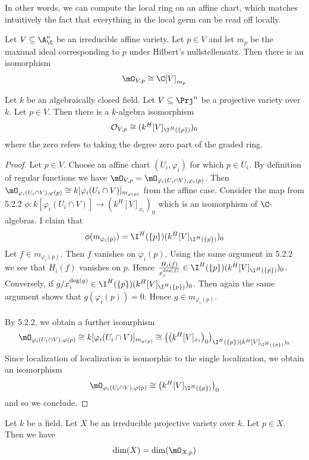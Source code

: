 \documentclass[a4paper]{article}
\begin{document}
In other words, we can compute the local ring on an affine chart, which matches intuitively the fact that everything in the local germ can be read off locally. 

\begin{prp}{}{} Let $V\subseteq\A_\C^n$ be an irreducible affine variety. Let $p\in V$ and let $m_p$ be the maximal ideal corresponding to $p$ under Hilbert's nullstellensatz. Then there is an isomorphism $$\mO_{V,p}\cong\C[V]_{m_p}$$
\end{prp}

\begin{prp}{}{} Let $k$ be an algebraically closed field. Let $V\subseteq\Prj^n$ be a projective variety over $k$. Let $p\in V$. Then there is a $k$-algebra isomorphism $$\mathcal{O}_{V,p}\cong(k^H[V]_{\I^H(\{p\})})_0$$ where the zero refers to taking the degree zero part of the graded ring. 
\begin{proof}
Let $p\in V$. Choose an affine chart $(U_i,\varphi_i)$ for which $p\in U_i$. By definition of regular functions we have $\mO_{V,p}=\mO_{\varphi_i(U_i\cap V),\varphi_i(p)}$.  Then $\mO_{\varphi_i(U_i\cap V),\varphi(p)}\cong k[\varphi_i(U_i\cap V)]_{m_{\varphi(p)}}$ from the affine case. Consider the map from 5.2.2 $\phi:k[\varphi_i(U_i\cap V)]\to (k^H[V]_{x_i})_0$ which is an isomorphism of $\C$-algebras. I claim that $$\phi(m_{\varphi_i(p)})=\I^H(\{p\})(k^H[V]_{\I^H(\{p\})})_0$$ Let $f\in m_{\varphi_i(p)}$. Then $f$ vanishes on $\varphi_i(p)$. Using the same argument in 5.2.2 we see that $H_i(f)$ vanishes on $p$. Hence $\frac{H_i(f)}{x_i^{\deg(f)}}\in\I^H(\{p\})(k^H[V]_{\I^H(\{p\})})_0$. Conversely, if $g/x_i^{\deg(g)}\in\I^H(\{p\})(k^H[V]_{\I^H(\{p\})})_0$. Then again the same argument shows that $g(\varphi_i(p))=0$. Hence $g\in m_{\varphi_i(p)}$. \\~\\

By 5.2.2, we obtain a further isomrphism $$\mO_{\varphi_i(U_i\cap V),\varphi(p)}\cong k[\varphi_i(U_i\cap V)]_{m_{\varphi(p)}}\cong\left(\left(k^H[V]_{x_i}\right)_0\right)_{\I^H(\{p\})(k^H[V]_{\I^H(\{p\})})_0}$$ Since localization of localization is isomorphic to the single localization, we obtain an isomorphism $$\mO_{\varphi_i(U_i\cap V),\varphi(p)}\cong\left(k^H[V]_{\I^H(\{p\})}\right)_0$$ and so we conclude. 
\end{proof}
\end{prp}

\begin{prp}{}{} Let $k$ be a field. Let $X$ be an irreducible projective variety over $k$. Let $p\in X$. Then we have $$\dim(X)=\dim(\mO_{X,p})$$
\end{prp}
\end{document}
